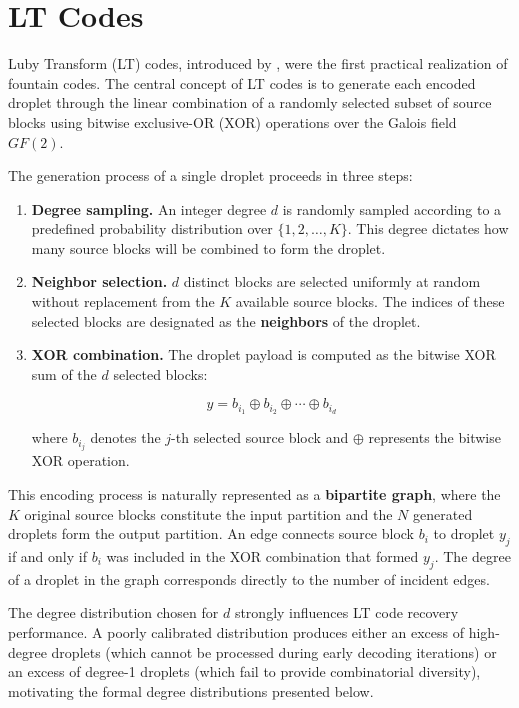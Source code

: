 \section{LT Codes}
\label{sec:lt_codes}

Luby Transform (LT) codes, introduced by , were the first practical realization of fountain codes. The central concept of LT codes is to generate each encoded droplet through the linear combination of a randomly selected subset of source blocks using bitwise exclusive-OR (XOR) operations over the Galois field $GF(2)$.

The generation process of a single droplet proceeds in three steps:

\begin{enumerate}
    \item \textbf{Degree sampling.} An integer degree $d$ is randomly sampled according to a predefined probability distribution over $\{1, 2, \ldots, K\}$. This degree dictates how many source blocks will be combined to form the droplet.
    
    \item \textbf{Neighbor selection.} $d$ distinct blocks are selected uniformly at random without replacement from the $K$ available source blocks. The indices of these selected blocks are designated as the \textbf{neighbors} of the droplet.
    
    \item \textbf{XOR combination.} The droplet payload is computed as the bitwise XOR sum of the $d$ selected blocks:
    
    \begin{equation}
        \label{eq:xor_droplet}
        y = b_{i_1} \oplus b_{i_2} \oplus \cdots \oplus b_{i_d}
    \end{equation}

    where $b_{i_j}$ denotes the $j$-th selected source block and $\oplus$ represents the bitwise XOR operation.
\end{enumerate}

This encoding process is naturally represented as a \textbf{bipartite graph}, where the $K$ original source blocks constitute the input partition and the $N$ generated droplets form the output partition. An edge connects source block $b_i$ to droplet $y_j$ if and only if $b_i$ was included in the XOR combination that formed $y_j$. The degree of a droplet in the graph corresponds directly to the number of incident edges.

The degree distribution chosen for $d$ strongly influences LT code recovery performance. A poorly calibrated distribution produces either an excess of high-degree droplets (which cannot be processed during early decoding iterations) or an excess of degree-1 droplets (which fail to provide combinatorial diversity), motivating the formal degree distributions presented below.

